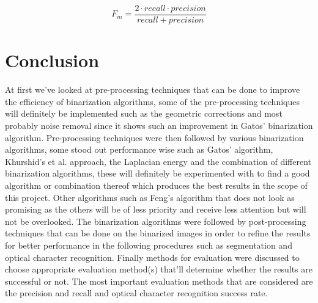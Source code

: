 \documentclass[11pt]{article}
\begin{document}
			\begin{large}
			\begin{equation} \label{eq:Fmeasure}
			 F_m = \frac{2 \cdot recall \cdot precision}{recall + precision}
			\end{equation}
			\end{large}


    \section{Conclusion}
		At first we've looked at pre-processing techniques that can be done to improve the efficiency of binarization algorithms, some of the pre-processing techniques will definitely be implemented such as the geometric corrections and most probably noise removal since it shows such an improvement in Gatos' binarization algorithm. Pre-processing techniques were then followed by various binarization algorithms, some stood out performance wise such as Gatos' algorithm, Khurshid's et al. approach, the Laplacian energy and the combination of different binarization algorithms, these will definitely be experimented with to find a good algorithm or combination thereof which produces the best results in the scope of this project. Other algorithms such as Feng's algorithm that does not look as promising as the others will be of less priority and receive less attention but will not be overlooked. The binarization algorithms were followed by post-processing techniques that can be done on the binarized images in order to refine the results for better performance in the following procedures such as segmentation and optical character recognition. Finally methods for evaluation were discussed to choose appropriate evaluation method(s) that'll determine whether the results are successful or not. The most important evaluation methods that are considered are the precision and recall and optical character recognition success rate.

  \newpage
    
    
    \thispagestyle{plain}
    \clearpage
\end{document}

